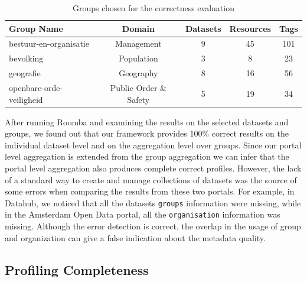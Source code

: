 \documentclass[runningheads,a4paper]{llncs}
\begin{document}
{\begin{table}[ht]
\centering
\begin{tabular}{|l|c|c|c|c|}
\hline
\textbf{Group Name}      & \textbf{Domain}        & \multicolumn{1}{l|}{\textbf{Datasets}} & \multicolumn{1}{l|}{\textbf{Resources}} & \multicolumn{1}{l|}{\textbf{Tags}} \\ \hline
bestuur-en-organisatie   & Management             & 9                                      & 45                                      & 101                                \\ \hline
bevolking                & Population             & 3                                      & 8                                       & 23                                 \\ \hline
geografie                & Geography              & 8                                      & 16                                      & 56                                 \\ \hline
openbare-orde-veiligheid & Public Order \& Safety & 5                                      & 19                                      & 34                                 \\ \hline
\end{tabular}
\caption{Groups chosen for the correctness evaluation}
\label{tab:groups_experiment}
\end{table}

After running Roomba and examining the results on the selected datasets and groups, we found out that our framework provides 100\% correct results on the individual dataset level and on the aggregation level over groups. Since our portal level aggregation is extended from the group aggregation we can infer that the portal level aggregation also produces complete correct profiles. However, the lack of a standard way to create and manage collections of datasets was the source of some errors when comparing the results from these two portals. For example, in Datahub, we noticed that all the datasets \texttt{groups} information were missing, while in the Amsterdam Open Data portal, all the \texttt{organisation} information was missing. Although the error detection is correct, the overlap in the usage of group and organization can give a false indication about the metadata quality.

\subsection{Profiling Completeness}

}
\end{document}
